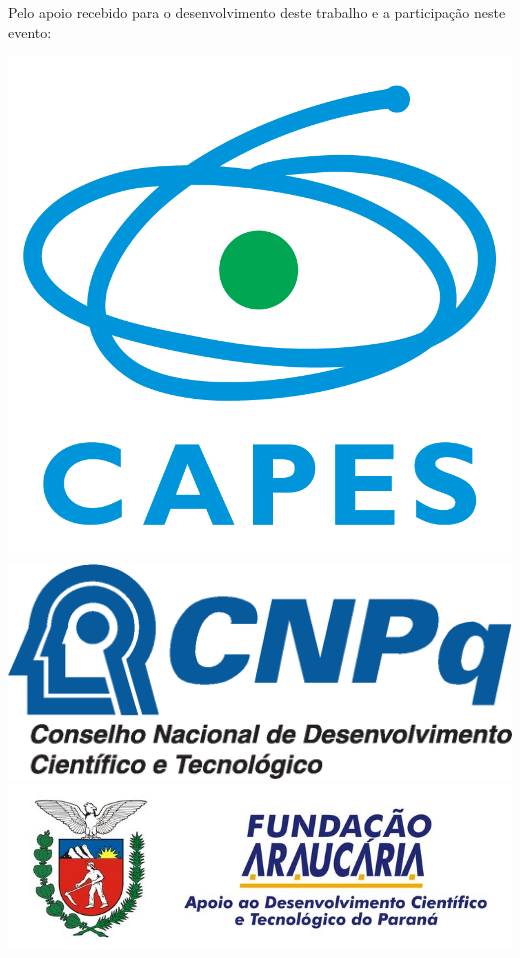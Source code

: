\documentclass[%
  10pt,%
  aspectratio = 169,%
  compress,%
  t,%
]{beamer}%
\begin{document}
\begin{frame}[c]{}{}
Pelo apoio recebido para o desenvolvimento deste trabalho e a participação neste evento:
\begin{center}
\includegraphics[height = \logoheight]{./Logos/logo-capes}
\hfill
\includegraphics[height = \logoheight]{./Logos/logo-cnpq}
\hfill
\includegraphics[height = \logoheight]{./Logos/logo-fa}

\end{center}
\end{frame}
\end{document}
